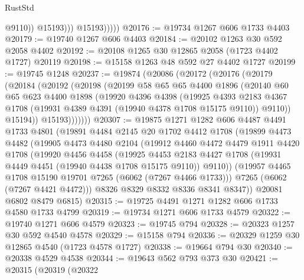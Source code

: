 \begin{lexlean}{RustStd}
\begin{coremodule}
                        @9110))
                    @15193)))
              @15193)))))
@20176 := @19734 @1267 @606 @1733 @4403
@20179 := @19740 @1267 @606 @4403
@20184 := @20102 @1263 @30 @592 @2058 @4402
@20192 := @20108 @1265 @30 @12865 @2058 (@1723 @4402 @1727) @20119
@20198 := @15158 @1263 @48 @592 @27 @4402 @1727
@20199 := @19745 @1248
@20237 := @19874
    (@20086
      (@20172
        (@20176
          (@20179
            (@20184
              (@20192
                (@20198
                  (@20199
                    @58
                    @65
                    @65
                    @4400
                    @1896
                    (@20140
                      @60
                      @65
                      @623
                      @4400
                      @1898
                      (@19920
                        @4396
                        @4398
                        (@19925
                          @4393
                          @2183
                          @4367
                          @1708
                          (@19931 @4389 @4391 (@19940 @4378 @1708 @15175 @9110))
                          @9110))
                      @15194))
                  @15193)))))))
@20307 := @19875
    @1271
    @1282
    @606
    @4487
    @4491
    @1733
    @4801
    (@19891
      @4484
      @2145
      @20
      @1702
      @4412
      @1708
      (@19899
        @4473
        @4482
        (@19905
          @4473
          @4480
          @2104
          (@19912
            @4460
            @4472
            @4479
            @1911
            @4420
            @1708
            (@19920
              @4456
              @4458
              (@19925
                @4453
                @2183
                @4427
                @1708
                (@19931 @4449 @4451 (@19940 @4438 @1708 @15175 @9110))
                @9110))
            (@19957 @4465 @1708 @15190 @19701 @7265 (@6062 (@7267 @4466 @1733)))
            @7265
            (@6062 (@7267 @4421 @4472)))
          @8326
          @8329
          @8332
          @8336
          @8341
          @8347))
      @20081
      @6802
      @8479
      @6815)
@20315 := @19725 @4491 @1271 @1282 @606 @1733 @4580 @1733 @4799
@20319 := @19734 @1271 @606 @1733 @4579
@20322 := @19740 @1271 @606 @4579
@20323 := @19745 @794
@20328 := @20323 @1257 @30 @592 @4540 @4578
@20329 := @15158 @794
@20336 := @20329 @1259 @30 @12865 @4540 (@1723 @4578 @1727)
@20338 := @19664 @794 @30
@20340 := @20338 @4529 @4538
@20344 := @19643 @562 @793 @373 @30
@20421 := @20315
    (@20319
      (@20322

\end{coremodule}
\end{lexlean}
